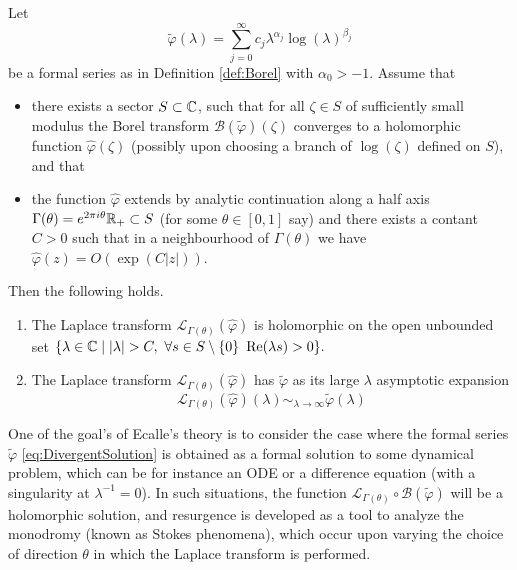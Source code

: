 \begin{theorem} \label{thm:BorelLaplaceresummation} Let \begin{equation} \label{eq:DivergentSolution} \tilde{\varphi}(\lambda)= \sum_{j=0}^{\infty} c_j \lambda^{\alpha_j} \log(\lambda)^{\beta_j} \end{equation} be a formal series as in Definition \ref{def:Borel} with $\alpha_0>-1.$ Assume that \begin{itemize} \item  there exists a sector $S \subset \mathbb{C}$, such that for all $\zeta \in S$ of sufficiently small modulus the Borel transform $\mathcal{B}(\tilde{\varphi})(\zeta)$ converges to a holomorphic function $\hat{\varphi}(\zeta)$ (possibly upon choosing a  branch of $\log(\zeta)$ defined on $S$), and that
		\item  the function $\hat{\varphi}$ extends by analytic continuation along a half axis  $ \Gamma(\theta)=e^{2\pi i\theta}\mathbb{R}_+ \subset S$ (for some $\theta \in [0,1]$ say) and there exists a contant $C>0$ such that in a neighbourhood of $\Gamma(\theta)$ we have $\hat{\varphi}(z) = O(\exp(C \lvert z \rvert)).$
		
		\end{itemize}  Then the following holds.
	
	\begin{enumerate} \item  The Laplace transform $\mathcal{L}_{\Gamma(\theta)}(\hat{\varphi})$ is holomorphic on the open unbounded set $\{\lambda \in \mathbb{C} \mid \lvert \lambda \rvert >C,  \  \forall s \in S\setminus \{0\} \  \operatorname{Re}(\lambda s)>0   \}.$
		\item The Laplace transform $\mathcal{L}_{\Gamma(\theta)}(\hat{\varphi})$  has $\tilde{\varphi}$ as its large $ \lambda $ asymptotic expansion
		\begin{equation}
\mathcal{L}_{\Gamma(\theta)}(\hat{\varphi})(\lambda) \sim_{\lambda \rightarrow \infty} \tilde{\varphi}(\lambda)
		\end{equation}
		\end{enumerate}
	\end{theorem}
One of the goal's of Ecalle's theory \cite{Ecalle81a,Ecalle81b} is to consider the case where the formal series $\tilde{\varphi}$  \eqref{eq:DivergentSolution} is obtained as a formal solution to some dynamical problem, which can be for instance an ODE or a difference equation (with a singularity at $\lambda^{-1}=0$). In such situations, the function $\mathcal{L}_{\Gamma(\theta)}\circ \mathcal{B}(\tilde{\varphi})$ will be a holomorphic solution, and resurgence is developed as a tool to analyze the monodromy (known as Stokes phenomena), which occur upon varying the choice of direction $\theta$ in which the Laplace transform is performed.


